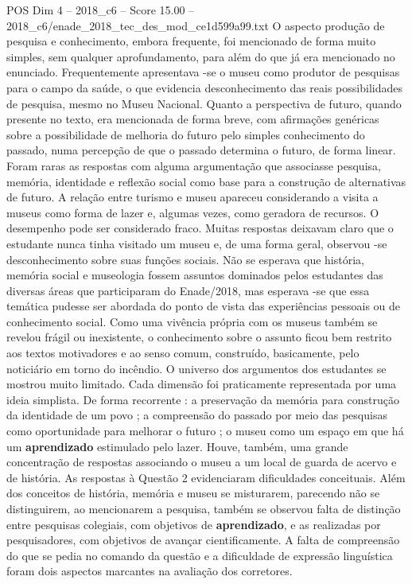 \begin{textsample}{POS Dim 4 – 2018\_c6 – Score 15.00 – 2018\_c6/enade\_2018\_tec\_des\_mod\_ce1d599a99.txt}
O aspecto produção de pesquisa e conhecimento, embora frequente, foi mencionado de forma muito simples, sem qualquer aprofundamento, para além do que já era mencionado no enunciado.
Frequentemente apresentava -se o museu como produtor de pesquisas para o campo da saúde, o que evidencia desconhecimento das reais possibilidades de pesquisa, mesmo no Museu Nacional.
Quanto a perspectiva de futuro, quando presente no texto, era mencionada de forma breve, com afirmações genéricas sobre a possibilidade de melhoria do futuro pelo simples conhecimento do passado, numa percepção de que o passado determina o futuro, de forma linear.
Foram raras as respostas com alguma argumentação que associasse pesquisa, memória, identidade e reflexão social como base para a construção de alternativas de futuro.
A relação entre turismo e museu apareceu considerando a visita a museus como forma de lazer e, algumas vezes, como geradora de recursos.
O desempenho pode ser considerado fraco.
Muitas respostas deixavam claro que o estudante nunca tinha visitado um museu e, de uma forma geral, observou -se desconhecimento sobre suas funções sociais.
Não se esperava que história, memória social e museologia fossem assuntos dominados pelos estudantes das diversas áreas que participaram do Enade/2018, mas esperava -se que essa temática pudesse ser abordada do ponto de vista das experiências pessoais ou de conhecimento social.
Como uma vivência própria com os museus também se revelou frágil ou inexistente, o conhecimento sobre o assunto ficou bem restrito aos textos motivadores e ao senso comum, construído, basicamente, pelo noticiário em torno do incêndio.
O universo dos argumentos dos estudantes se mostrou muito limitado.
Cada dimensão foi praticamente representada por uma ideia simplista.
De forma recorrente : a preservação da memória para construção da identidade de um povo ; a compreensão do passado por meio das pesquisas como oportunidade para melhorar o futuro ; o museu como um espaço em que há um \textbf{aprendizado} estimulado pelo lazer.
Houve, também, uma grande concentração de respostas associando o museu a um local de guarda de acervo e de história.
As respostas à Questão 2 evidenciaram dificuldades conceituais.
Além dos conceitos de história, memória e museu se misturarem, parecendo não se distinguirem, ao mencionarem a pesquisa, também se observou falta de distinção entre pesquisas colegiais, com objetivos de \textbf{aprendizado}, e as realizadas por pesquisadores, com objetivos de avançar cientificamente.
A falta de compreensão do que se pedia no comando da questão e a dificuldade de expressão linguística foram dois aspectos marcantes na avaliação dos corretores.

\end{textsample}
